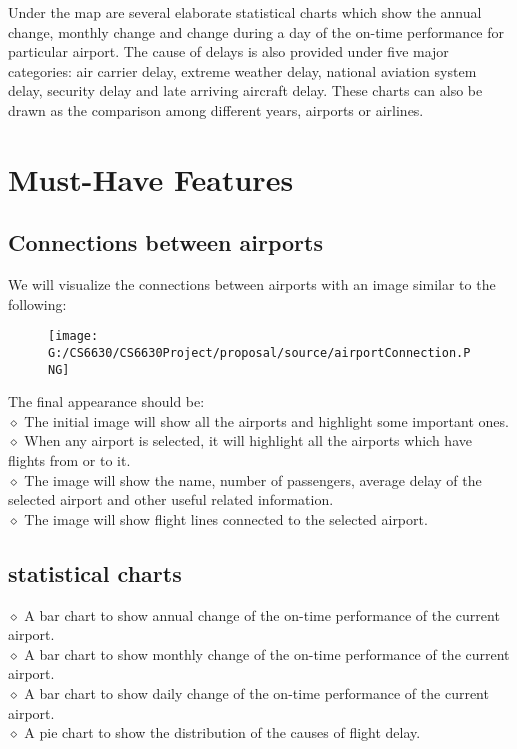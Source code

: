 \documentclass[12pt]{article}
\begin{document}
Under the map are several elaborate statistical charts which show the annual change, monthly change and change during a day of the on-time performance for particular airport. The cause of delays is also provided under five major categories: air carrier delay, extreme weather delay, national aviation system delay, security delay and late arriving aircraft delay. These charts can also be drawn as the comparison among different years, airports or airlines.

\section{Must-Have Features}
    \subsection{Connections between airports}
    We will visualize the connections between airports with an image similar to the following:
    \begin{figure}[H]
      \centering
      \texttt{[image: G:/CS6630/CS6630Project/proposal/source/airportConnection.PNG]}
    \end{figure}
    \noindent The final appearance should be:\\
    $\diamond$ The initial image will show all the airports and highlight some important ones.\\
    $\diamond$ When any airport is selected, it will highlight all the airports which have flights from or to it.\\
    $\diamond$ The image will show the name, number of passengers, average delay of the selected airport and other useful related information.\\
    $\diamond$ The image will show flight lines connected to the selected airport.

    \subsection{statistical charts}
    $\diamond$ A bar chart to show annual change of the on-time performance of the current airport.\\
    $\diamond$ A bar chart to show monthly change of the on-time performance of the current airport.\\
    $\diamond$ A bar chart to show daily change of the on-time performance of the current airport.\\
    $\diamond$ A pie chart to show the distribution of the causes of flight delay.\\
\end{document}
